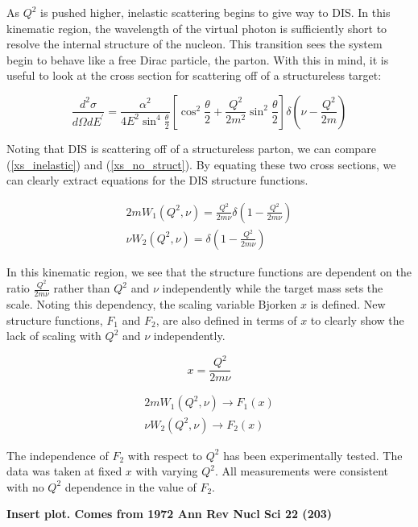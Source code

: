 As $Q^2$ is pushed higher, inelastic scattering begins to give way to DIS. In this kinematic region, the wavelength of the virtual photon is sufficiently short to resolve the internal structure of the nucleon. This transition sees the system begin to behave like a free Dirac particle, the parton. With this in mind, it is useful to look at the cross section for scattering off of a structureless target:

\begin{equation}
	\frac{d^2\sigma}{d\Omega dE^\prime} = \frac{\alpha^2}{4E^{2}\sin^{4}\frac{\theta}{2}} \left[\cos^{2}\frac{\theta}{2} + \frac{Q^2}{2m^2}\sin^{2}\frac{\theta}{2}\right] \delta\left(\nu-\frac{Q^2}{2m}\right)
	\label{xs_no_struct}
\end{equation}

Noting that DIS is scattering off of a structureless parton, we can compare (\ref{xs_inelastic}) and (\ref{xs_no_struct}). By equating these two cross sections, we can clearly extract equations for the DIS structure functions.

\begin{subequations}
\begin{align}
	2mW_1\left(Q^{2},\nu\right) = \frac{Q^2}{2m\nu}\delta\left(1-\frac{Q^2}{2m\nu}\right) \\
	\nu W_2\left(Q^{2},\nu\right) = \delta\left(1-\frac{Q^2}{2m\nu}\right)
\end{align}
\end{subequations}

In this kinematic region, we see that the structure functions are dependent on the ratio $\frac{Q^2}{2m\nu}$ rather than $Q^2$ and $\nu$ independently while the target mass sets the scale. Noting this dependency, the scaling variable Bjorken $x$ is defined. New structure functions, $F_1$ and $F_2$, are also defined in terms of $x$ to clearly show the lack of scaling with $Q^2$ and $\nu$ independently.

\begin{equation}
	x = \frac{Q^2}{2m\nu}
\end{equation}

\begin{subequations}
\begin{align}
	2mW_1\left(Q^{2},\nu\right) \rightarrow F_{1}\left(x\right) \\
	\nu W_2\left(Q^{2},\nu\right) \rightarrow F_{2}\left(x\right)
\end{align}
\end{subequations}

The independence of $F_2$ with respect to $Q^2$ has been experimentally tested. The data was taken at fixed $x$ with varying $Q^2$. All measurements were consistent with no $Q^2$ dependence in the value of $F_2$.

\textbf{Insert plot. Comes from 1972 Ann Rev Nucl Sci 22 (203)}